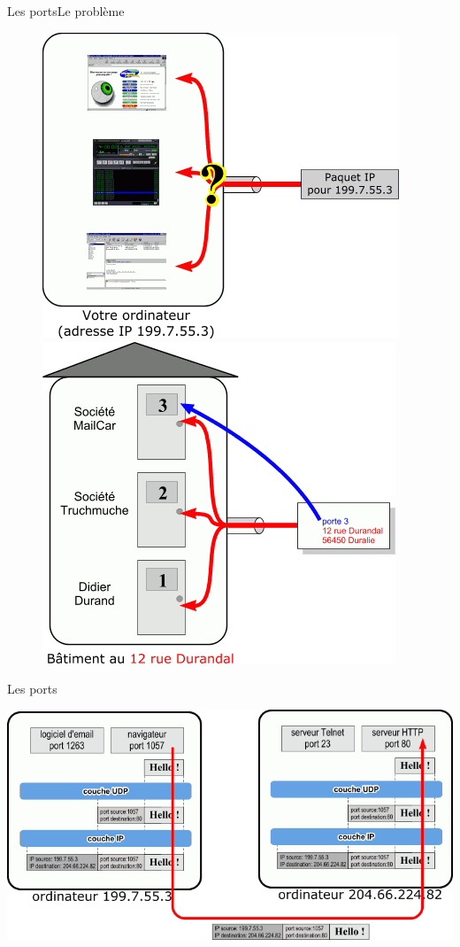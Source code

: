 \documentclass{beamer}
\begin{document}
	\begin{frame}{Les ports}{Le problème}
	\begin{figure}
		\includegraphics[scale=0.4]{port1.png} \hspace{0.5cm}
		\includegraphics[scale=0.4]{port2.png}
	\end{figure}
	\end{frame}	
	\begin{frame}{Les ports}
		\begin{center}
		\includegraphics[scale=0.4]{port4.png}
		\end{center}
	\end{frame}
\end{document}
